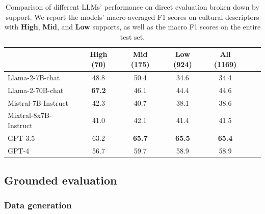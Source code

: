 \documentclass{article} %
\newcommand{\diyi}[1]{\textcolor{blue}{[#1 --diyi]}}
\newcommand{\wyshi}[1]{\textcolor{red}{[#1 --Weiyan]}}
\newcommand{\ryan}[1]{\textcolor{magenta}{[#1 --Ryan]}}
\begin{document}
\begin{table}[H]
\centering
\begin{tabular}{lcccccc}
\toprule
& \textbf{High} (70) & \textbf{Mid} (175) & \textbf{Low} (924) & \textbf{All} (1169) \\
\midrule
Llama-2-7B-chat & 48.8 & 50.4 & 34.6 & 34.4 \\
\midrule
Llama-2-70B-chat & \textbf{67.2}  & 46.1  & 44.4 & 44.6 \\
\midrule
Mistral-7B-Instruct  & 42.3  & 40.7  & 38.1 & 38.6 \\
\midrule
Mixtral-8x7B-Instruct  & 41.0  & 42.1  & 41.4 & 41.5 \\
\midrule
GPT-3.5  & 63.2  & \textbf{65.7}  & \textbf{65.5} & \textbf{65.4} \\
\midrule
GPT-4  & 56.7  & 59.7  & 58.9 & 58.9 \\
\bottomrule
\end{tabular}
\caption{Comparison of different LLMs' performance on direct evaluation broken down by support. We report the models' macro-averaged F1 scores on cultural descriptors with \textbf{High}, \textbf{Mid}, and \textbf{Low} supports, as well as the macro F1 scores on the entire test set.
}
\label{tab:direct_eval}
\end{table}

\subsection{Grounded evaluation}
\label{appendix:grounded evaluation}

\subsubsection{Data generation}
\end{document}
